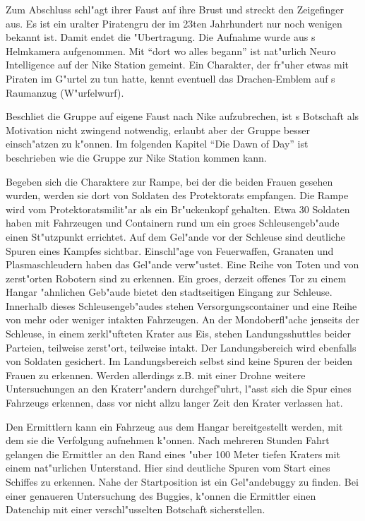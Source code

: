 Zum Abschluss schl"agt \xl{} ihrer Faust auf ihre Brust und streckt den Zeigefinger aus. Es ist ein uralter Piratengru\3 der im 23ten Jahrhundert nur noch wenigen bekannt ist. Damit endet die "Ubertragung. Die Aufnahme wurde aus \ml{}s Helmkamera aufgenommen. Mit "`dort wo alles begann"' ist nat"urlich Neuro Intelligence auf der Nike Station gemeint. Ein Charakter, der fr"uher etwas mit Piraten im G"urtel zu tun hatte, kennt eventuell das Drachen-Emblem auf \xl{}s Raumanzug (W"urfelwurf).

Beschlie\3t die Gruppe auf eigene Faust nach Nike aufzubrechen, ist \xl{}s Botschaft als Motivation nicht zwingend notwendig, erlaubt aber der Gruppe \xl{} besser einsch"atzen zu k"onnen. Im folgenden Kapitel "`Die Dawn of Day"' ist beschrieben wie die Gruppe zur Nike Station kommen kann.

Begeben sich die Charaktere zur Rampe, bei der die beiden Frauen gesehen wurden, werden sie dort von Soldaten des Protektorats empfangen. Die Rampe wird vom Protektoratsmilit"ar als ein Br"uckenkopf gehalten. Etwa 30 Soldaten haben mit Fahrzeugen und Containern rund um ein gro\3es Schleusengeb"aude einen St"utzpunkt errichtet. Auf dem Gel"ande vor der Schleuse sind deutliche Spuren eines Kampfes sichtbar. Einschl"age von Feuerwaffen, Granaten und Plasmaschleudern haben das Gel"ande verw"ustet. Eine Reihe von Toten und von zerst"orten Robotern sind zu erkennen. Ein gro\3es, derzeit offenes Tor zu einem Hangar "ahnlichen Geb"aude bietet den stadtseitigen Eingang zur Schleuse. Innerhalb dieses Schleusengeb"audes stehen Versorgungscontainer und eine Reihe von mehr oder weniger intakten Fahrzeugen. An der Mondoberfl"ache jenseits der Schleuse, in einem zerkl"ufteten Krater aus Eis, stehen Landungsshuttles beider Parteien, teilweise zerst"ort, teilweise intakt. Der Landungsbereich wird ebenfalls von Soldaten gesichert. Im Landungsbereich selbst sind keine Spuren der beiden Frauen zu erkennen. Werden allerdings z.B. mit einer Drohne weitere Untersuchungen an den Kraterr"andern durchgef"uhrt, l"asst sich die Spur eines Fahrzeugs erkennen, dass vor nicht allzu langer Zeit den Krater verlassen hat. 

Den Ermittlern kann ein Fahrzeug aus dem Hangar bereitgestellt werden, mit dem sie die Verfolgung aufnehmen k"onnen. Nach mehreren Stunden Fahrt gelangen die Ermittler an den Rand eines "uber 100 Meter tiefen Kraters mit einem nat"urlichen Unterstand. Hier sind deutliche Spuren vom Start eines Schiffes zu erkennen. Nahe der Startposition ist ein Gel"andebuggy zu finden. Bei einer genaueren Untersuchung des Buggies, k"onnen die Ermittler einen Datenchip mit einer verschl"usselten Botschaft sicherstellen.


